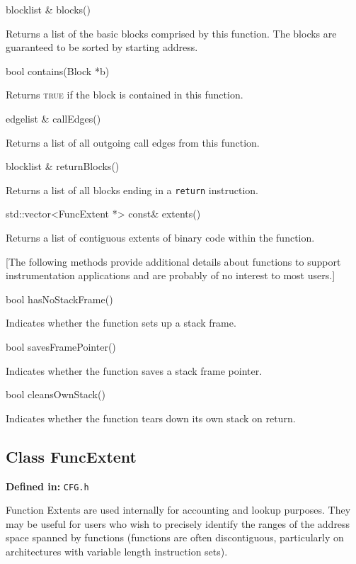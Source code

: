 \documentclass{article}
\newenvironment{apient}{\small\verbatim}{\endverbatim}
\newcommand{\apidesc}[1]{%
{\addtolength{\leftskip}{4em}%
#1\par\medskip}
}
\newcommand{\definedin}[1]{%
\textbf{Defined in:} \texttt{#1}
}
\begin{document}
\begin{apient}
blocklist & blocks()
\end{apient}
\apidesc{Returns a list of the basic blocks comprised by this function. The blocks are guaranteed to be sorted by starting address.}

\begin{apient}
bool contains(Block *b)
\end{apient}
\apidesc{Returns {\scshape true} if the block is contained in this function.}

\begin{apient}
edgelist & callEdges()
\end{apient}
\apidesc{Returns a list of all outgoing call edges from this function.}

\begin{apient}
blocklist & returnBlocks()
\end{apient}
\apidesc{Returns a list of all blocks ending in a \texttt{return} instruction.}

\begin{apient}
std::vector<FuncExtent *> const& extents()
\end{apient}
\apidesc{Returns a list of contiguous extents of binary code within the function.}

[The following methods provide additional details about functions to support instrumentation applications and are probably of no interest to most users.]

\begin{apient}
bool hasNoStackFrame()
\end{apient}
\apidesc{Indicates whether the function sets up a stack frame.}

\begin{apient}
bool savesFramePointer()
\end{apient}
\apidesc{Indicates whether the function saves a stack frame pointer.}

\begin{apient}
bool cleansOwnStack()
\end{apient}
\apidesc{Indicates whether the function tears down its own stack on return.}

\subsection{Class FuncExtent}

\definedin{CFG.h}

Function Extents are used internally for accounting and lookup purposes. They may be useful for users who wish to precisely identify the ranges of the address space spanned by functions (functions are often discontiguous, particularly on architectures with variable length instruction sets).
\end{document}
